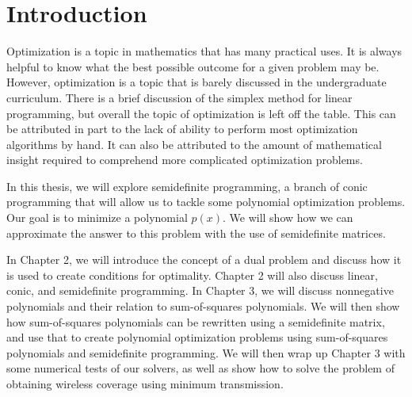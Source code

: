 
\chapter{Introduction}

Optimization is a topic in mathematics that has many practical uses. It is always helpful to know what the best possible outcome for a given problem may be. However, optimization is a topic that is barely discussed in the undergraduate curriculum. There is a brief discussion of the simplex method for linear programming, but overall the topic of optimization is left off the table. This can be attributed in part to the lack of ability to perform most optimization algorithms by hand. It can also be attributed to the amount of mathematical insight required to comprehend more complicated optimization problems.

In this thesis, we will explore semidefinite programming, a branch of conic programming that will allow us to tackle some polynomial optimization problems. Our goal is to minimize a polynomial $p(x)$. We will show how we can approximate the answer to this problem with the use of semidefinite matrices.

In Chapter 2, we will introduce the concept of a dual problem and discuss how it is used to create conditions for optimality. Chapter 2 will also discuss linear, conic, and semidefinite programming. In Chapter 3, we will discuss nonnegative polynomials and their relation to sum-of-squares polynomials. We will then show how sum-of-squares polynomials can be rewritten using a semidefinite matrix, and use that to create polynomial optimization problems using sum-of-squares polynomials and semidefinite programming. We will then wrap up Chapter 3 with some numerical tests of our solvers, as well as show how to solve the problem of obtaining wireless coverage using minimum transmission.
